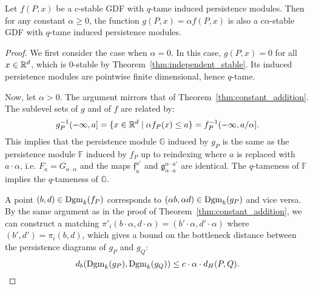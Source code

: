 \begin{theorem}
    \label{thm:constant_nonneg_multiplication}
    Let $f(P, x)$ be a $c$-stable GDF with $q$-tame induced persistence modules.
    Then for any constant $\alpha \geq 0$, the function
    $g(P, x) = \alpha f(P, x)$ is also a $c\alpha$-stable GDF with
    $q$-tame induced persistence modules.
\end{theorem}
\begin{proof}
    We first consider the case when $\alpha = 0$.
    In this case, $g(P, x) = 0$ for all $x \in \mathbb{R}^d$, which is $0$-stable
    by Theorem~\ref{thm:independent_stable}. Its induced persistence modules
    are pointwise finite dimensional, hence $q$-tame.
    
    Now, let $\alpha > 0$.
    The argument mirrors that of Theorem~\ref{thm:constant_addition}.
    The sublevel sets of $g$ and of $f$ are related by:
    \begin{equation}
        g^{-1}_P(-\infty, a] = \{x \in \mathbb{R}^d \mid \alpha f_P(x) \leq a\} = f^{-1}_P(-\infty, a/\alpha].
    \end{equation}
    This implies that the persistence module $\mathbb{G}$ induced by $g_P$ is
    the same as the persistence module $\mathbb{F}$ induced by $f_P$ up to reindexing where $a$ is replaced with $a \cdot \alpha$, i.e.
    $F_a = G_{a \cdot \alpha}$ and the maps $\mathfrak{f}_a^{a'}$ and
    $\mathfrak{g}_{\alpha \cdot a}^{\alpha \cdot a'}$ are identical.
    The $q$-tameness of $\mathbb{F}$ implies the $q$-tameness of $\mathbb{G}$.

    A point $(b, d)\in \operatorname{Dgm}_k(f_P)$ corresponds to $(\alpha b, \alpha d) \in
    \operatorname{Dgm}_k(g_P)$ and vice versa. By the same argument as in the proof of
    Theorem~\ref{thm:constant_addition}, we can construct a matching
    $\pi'_i(b \cdot \alpha, d \cdot \alpha) = (b' \cdot \alpha, d' \cdot \alpha)$ where
    $(b', d') = \pi_i(b, d)$, which gives a bound on the bottleneck distance
    between the persistence diagrams of $g_P$ and $g_Q$:
    \begin{equation}
        d_b(\operatorname{Dgm}_k(g_P), \operatorname{Dgm}_k(g_Q)) \leq c \cdot \alpha \cdot d_H(P, Q).
    \end{equation}
\end{proof}

